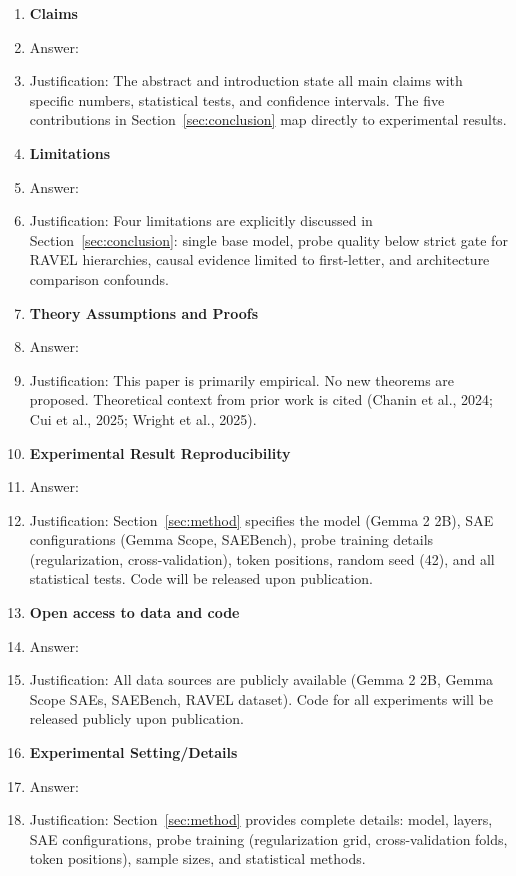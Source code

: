\documentclass{article}
\begin{document}
\begin{enumerate}

\item {\bf Claims}
    \item[] Answer: \answerYes{}
    \item[] Justification: The abstract and introduction state all main claims with specific numbers, statistical tests, and confidence intervals. The five contributions in Section~\ref{sec:conclusion} map directly to experimental results.

\item {\bf Limitations}
    \item[] Answer: \answerYes{}
    \item[] Justification: Four limitations are explicitly discussed in Section~\ref{sec:conclusion}: single base model, probe quality below strict gate for RAVEL hierarchies, causal evidence limited to first-letter, and architecture comparison confounds.

\item {\bf Theory Assumptions and Proofs}
    \item[] Answer: \answerNA{}
    \item[] Justification: This paper is primarily empirical. No new theorems are proposed. Theoretical context from prior work is cited (Chanin et al., 2024; Cui et al., 2025; Wright et al., 2025).

\item {\bf Experimental Result Reproducibility}
    \item[] Answer: \answerYes{}
    \item[] Justification: Section~\ref{sec:method} specifies the model (Gemma 2 2B), SAE configurations (Gemma Scope, SAEBench), probe training details (regularization, cross-validation), token positions, random seed (42), and all statistical tests. Code will be released upon publication.

\item {\bf Open access to data and code}
    \item[] Answer: \answerYes{}
    \item[] Justification: All data sources are publicly available (Gemma 2 2B, Gemma Scope SAEs, SAEBench, RAVEL dataset). Code for all experiments will be released publicly upon publication.

\item {\bf Experimental Setting/Details}
    \item[] Answer: \answerYes{}
    \item[] Justification: Section~\ref{sec:method} provides complete details: model, layers, SAE configurations, probe training (regularization grid, cross-validation folds, token positions), sample sizes, and statistical methods.


\end{enumerate}
\end{document}
